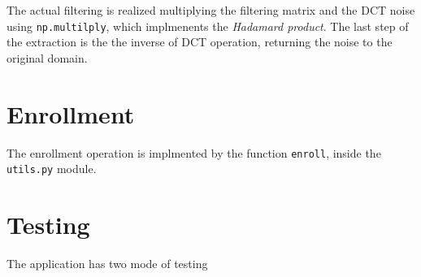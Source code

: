 \begin{enumerate}
        The actual filtering is realized multiplying the filtering matrix and the DCT noise using \texttt{np.multilply}, which implmenents the \emph{Hadamard product}. The last step of the extraction is the the inverse of DCT operation, returning the noise to the original domain.


        \section{Enrollment}\label{sec:enrollment}
        The enrollment operation is implmented by the function \texttt{enroll}, inside the \texttt{utils.py} module.


        \section{Testing}\label{sec:testing}
        The application has two mode of testing






\end{enumerate}
